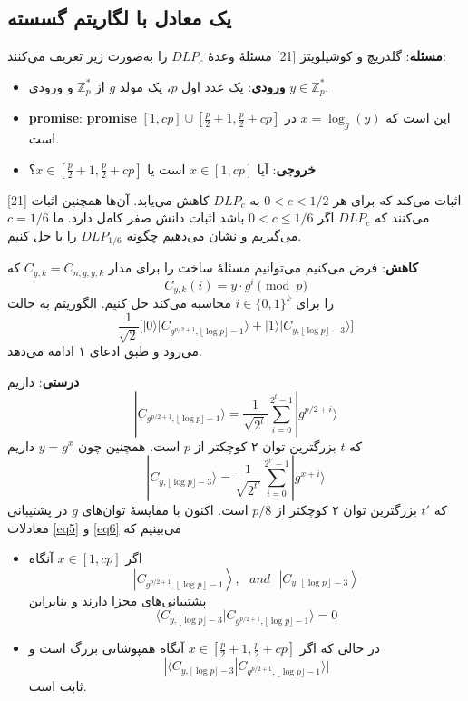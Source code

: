 \subsection{یک   معادل با لگاریتم گسسته}
\textbf{مسئله}: گلدریچ و کوشیلویتز [21] مسئلهٔ وعدهٔ
$DLP_c$ 
را به‌صورت زیر تعریف می‌کنند:
\begin{itemize}
	\item 
	\textbf{ورودی}: یک عدد اول $p$، یک مولد $g$ از $\mathbb{Z}_p^*$ و ورودی $y \in \mathbb{Z}_p^*$.
	\item
	\textbf{promise}:
	 \textbf{promise} این است که $x = \log_g(y)$ در $[1, cp] \cup [\frac{p}{2}+1, \frac{p}{2}+cp]$ است.
	\item
	\textbf{خروجی}: آیا $x \in [1, cp]$ است یا $x \in [\frac{p}{2}+1, \frac{p}{2}+cp]$؟
\end{itemize}
[21] اثبات می‌کند که  برای هر $0 < c < 1/2$ به
$DLP_c$ 
کاهش می‌یابد. آن‌ها همچنین اثبات می‌کنند که
$DLP_c$ 
اگر $0 < c \le 1/6$ باشد اثبات دانش صفر کامل دارد. ما $c = 1/6$ می‌گیریم و نشان می‌دهیم چگونه
$DLP_{1/6}$
  را با  حل کنیم.

\textbf{کاهش}:
 فرض می‌کنیم می‌توانیم مسئلهٔ ساخت را برای مدار $C_{y,k} = C_{n,g,y,k}$ که
  $$C_{y,k}(i) = y \cdot g^i \pmod{p}$$
  را برای $i \in \{0,1\}^k$ 
 محاسبه می‌کند حل کنیم. الگوریتم به حالت 
 $$\frac{1}{\sqrt{2}}\bigl[ |0\rangle |C_{g^{p/2+1},\lfloor \log p \rfloor - 1}\rangle + |1\rangle |C_{y,\lfloor \log p \rfloor - 3}\rangle \bigr]$$ 
 می‌رود و طبق ادعای ۱ ادامه می‌دهد.

\textbf{درستی}:
 داریم
  \begin{equation}\label{eq5}
  	|C_{g^{p/2+1},\lfloor \log p \rfloor - 1}\rangle = \frac{1}{\sqrt{2^t}} \sum_{i=0}^{2^t - 1} |g^{p/2 + i}\rangle
  \end{equation}
 که $t$ بزرگترین توان ۲ کوچکتر از $p$ است. همچنین چون $y = g^x$ داریم 
\begin{equation}\label{eq6}
	 |C_{y,\lfloor \log p \rfloor - 3}\rangle = \frac{1}{\sqrt{2^{t'}}} \sum_{i=0}^{2^{t'}-1} |g^{x+i}\rangle
\end{equation}
 که $t'$ بزرگترین توان ۲ کوچکتر از $p/8$ است. اکنون با مقایسهٔ توان‌های $g$ در پشتیبانی معادلات \eqref{eq5} و \eqref{eq6} می‌بینیم که 
 \begin{itemize}
 	\item 
 	اگر $x \in [1, cp]$ آنگاه
 	\[\left| {{C_{{g^{p/2 + 1}},\left\lfloor {\log p} \right\rfloor  - 1}}} \right\rangle ,\,\,\,\,and\,\,\,\,\left| {{C_{y,\left\lfloor {\log p} \right\rfloor  - 3}}} \right\rangle \]
 	پشتیبانی‌های مجزا دارند و بنابراین
 	$$\langle C_{y,\lfloor \log p \rfloor - 3} | C_{g^{p/2+1},\lfloor \log p \rfloor - 1} \rangle = 0$$
 	\item
 	 در حالی که اگر $x \in [\frac{p}{2}+1, \frac{p}{2}+cp]$ آنگاه همپوشانی بزرگ است و
 	$$|\langle C_{y,\lfloor \log p \rfloor - 3} | C_{g^{p/2+1},\lfloor \log p \rfloor - 1} \rangle|$$ 
 	ثابت است.
 \end{itemize}
